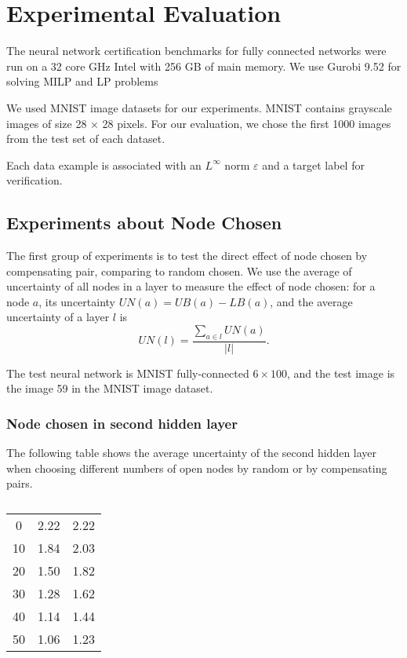\documentclass{llncs}
\begin{document}
\section{Experimental Evaluation}

The neural network certification benchmarks for fully connected networks were run on a 32 core
GHz Intel with 256 GB of main memory. We use Gurobi 9.52 for solving MILP and LP problems


We used MNIST image datasets for our experiments. MNIST contains grayscale images of size 28 × 28 pixels. For our evaluation, we chose the first
1000 images from the test set of each dataset.

Each data example is associated with an $L^\infty$ norm $\varepsilon$ and a target label
for verification.

\subsection{Experiments about Node Chosen}

The first group of experiments is to test the direct effect of node chosen by compensating pair, comparing to random chosen. We use the average of uncertainty of all nodes in a layer to measure the effect of node chosen: for a node $a$, its uncertainty $UN(a) = UB(a)-LB(a)$, and the average uncertainty of a layer $l$ is $$UN(l) = \dfrac{\sum_{a\in l}UN(a)}{|l|}.$$

The test neural network is MNIST fully-connected $6\times 100$, and the test image is the image 59 in the MNIST image dataset. 

\subsubsection*{Node chosen in second hidden layer}

The following table shows the average uncertainty of the second hidden layer when choosing different numbers of open nodes by random or by compensating pairs.

\begin{table}
	\centering
	\begin{tabular}{c|c|c}

	\text{Number of open nodes}  &  \text{Compensating} & \text{Random}  \\ \hline
	0  &  2.22 & 2.22  \\ \hline
	10  &  1.84 & 2.03  \\ \hline
	20  &  1.50 & 1.82  \\ \hline
	30  &  1.28 & 1.62  \\ \hline
	40  &  1.14 & 1.44  \\ \hline
	50  &  1.06 & 1.23  \\ \hline
\end{tabular}
\caption{}
\label{tab:example0}
\end{table}
\end{document}
